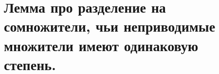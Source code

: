 \section{
 Лемма про разделение на сомножители, чьи неприводимые множители имеют одинаковую степень.
}
